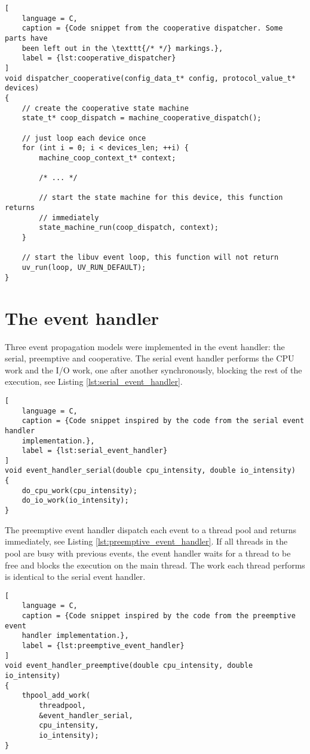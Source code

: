 \begin{lstlisting}[
    language = C,
    caption = {Code snippet from the cooperative dispatcher. Some parts have
    been left out in the \texttt{/* */} markings.},
    label = {lst:cooperative_dispatcher}
]
void dispatcher_cooperative(config_data_t* config, protocol_value_t* devices)
{
    // create the cooperative state machine
    state_t* coop_dispatch = machine_cooperative_dispatch();

    // just loop each device once
    for (int i = 0; i < devices_len; ++i) {
        machine_coop_context_t* context;

        /* ... */

        // start the state machine for this device, this function returns
        // immediately
        state_machine_run(coop_dispatch, context);
    }

    // start the libuv event loop, this function will not return
    uv_run(loop, UV_RUN_DEFAULT);
}
\end{lstlisting}

\section{The event handler}
\label{sec:impl_event_handler}

Three event propagation models were implemented in the event handler: the
serial, preemptive and cooperative. The serial event handler performs the CPU
work and the I/O work, one after another synchronously, blocking the rest of the
execution, see Listing \ref{lst:serial_event_handler}.

\begin{lstlisting}[
    language = C,
    caption = {Code snippet inspired by the code from the serial event handler
    implementation.},
    label = {lst:serial_event_handler}
]
void event_handler_serial(double cpu_intensity, double io_intensity)
{
    do_cpu_work(cpu_intensity);
    do_io_work(io_intensity);
}
\end{lstlisting}

The preemptive event handler dispatch each event to a thread pool and returns
immediately, see Listing \ref{lst:preemptive_event_handler}. If all threads in
the pool are busy with previous events, the event handler waits for a thread to
be free and blocks the execution on the main thread. The work each thread
performs is identical to the serial event handler.

\begin{lstlisting}[
    language = C,
    caption = {Code snippet inspired by the code from the preemptive event
    handler implementation.},
    label = {lst:preemptive_event_handler}
]
void event_handler_preemptive(double cpu_intensity, double io_intensity)
{
    thpool_add_work(
        threadpool,
        &event_handler_serial,
        cpu_intensity,
        io_intensity);
}
\end{lstlisting}

